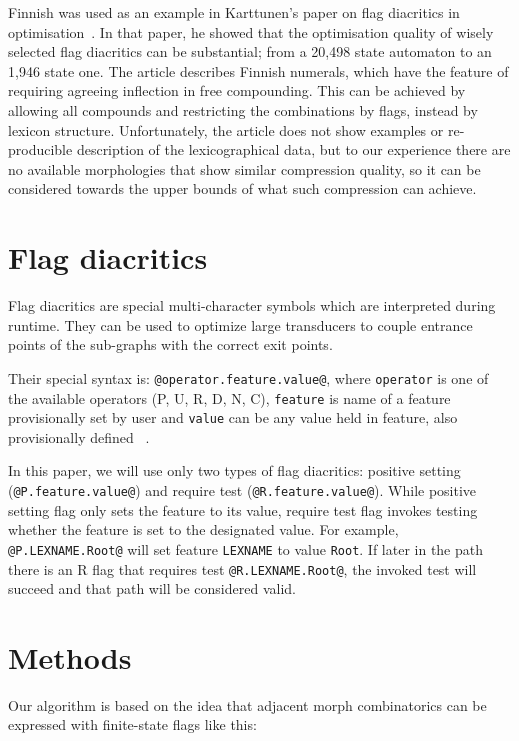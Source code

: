 \documentclass[10pt, a4paper]{article}
\begin{document}
Finnish was used as an example in Karttunen's paper on flag diacritics
in optimisation~. In that paper, he
showed that the optimisation quality of wisely selected flag
diacritics can be substantial; from a 20,498 state automaton to an
1,946 state one. The article describes Finnish numerals, which have
the feature of requiring agreeing inflection in free compounding. This
can be achieved by allowing all compounds and restricting the
combinations by flags, instead by lexicon structure. Unfortunately,
the article does not show examples or re-producible description of the
lexicographical data, but to our experience there are no available
morphologies that show similar compression quality, so it can be
considered towards the upper bounds of what such compression can
achieve.
 
\section{Flag diacritics}
\label{sec:flags}

Flag diacritics are special multi-character symbols which are interpreted during runtime. They can be used to optimize large transducers to couple entrance points of the sub-graphs with the correct exit points.

Their special syntax is: \verb+@operator.feature.value@+, where
\texttt{operator} is one of the available operators (P, U, R, D, N, C), \texttt{feature} is name of a feature provisionally set by user and \texttt{value} can be any value held in feature, also provisionally defined ~\cite{beesley2003finite}.


In this paper, we will use only two types of flag diacritics: positive
setting (\verb+@P.feature.value@+) and require test
(\verb+@R.feature.value@+). While positive setting flag only sets the
feature to its value, require test flag invokes testing whether the
feature is set to the designated value.  For example,
\verb+@P.LEXNAME.Root@+ will set feature \texttt{LEXNAME} to value
\texttt{Root}. If later in the path there is an R flag that requires test
\verb+@R.LEXNAME.Root@+, the invoked test will succeed and that path
will be considered valid.



\section{Methods}
\label{sec:methods}

Our algorithm is based on the idea that adjacent morph combinatorics can be expressed with finite-state flags like this:
\end{document}

